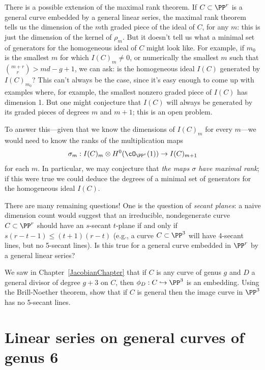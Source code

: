 There is a possible extension of the maximal rank theorem. If $C \subset \PP^r$ is a general curve embedded by a general linear series, the maximal rank theorem tells us the dimension of the $m$th graded piece of the ideal of $C$, for any $m$: this is just the dimension of the kernel of $\rho_m$. But it doesn't tell us what a minimal set of generators for the homogeneous ideal of $C$ might look like. For example, if $m_0$ is the smallest $m$ for which $I(C)_m \neq 0$, or numerically the smallest $m$ such that $\binom{m+r}{r} > md-g+1$, we can ask: is the homogeneous ideal $I(C)$ generated by $I(C)_{m_0}$? This can't always be the case, since it's easy enough to come up with examples where, for example, the  smallest nonzero graded piece of $I(C)$ has dimension 1. But one might conjecture that $I(C)$ will always be generated by its graded pieces of degrees $m$ and $m+1$; this is an open problem.

To answer this---given that we know the dimensions of $I(C)_m$ for every $m$---we would need to know the ranks of the multiplication maps
$$
\sigma_m : I(C)_m \otimes H^0(\cO_{\PP^r}(1)) \to I(C)_{m+1}
$$
for each $m$. In particular, we may conjecture that \emph{the maps $\sigma$ have maximal rank}; if this were true we could deduce the degrees of a minimal set of generators for the homogeneous ideal $I(C)$.


There are many remaining questions! One is the question of \emph{secant planes}: a naive dimension count would suggest that an irreducible, nondegenerate curve $C \subset \PP^r$ should have an $s$-secant $t$-plane if and only if $s(r-t-1) \leq (t+1)(r-t)$
(e.g., a curve $C \subset \PP^3$ will have 4-secant lines, but no 5-secant lines). Is this true for a general curve embedded in $\PP^r$ by a general linear series?

\begin{exercise}
We saw in Chapter~\ref{JacobianChapter} that if $C$ is any curve of genus $g$ and $D$ a general divisor of degree $g+3$ on $C$, then $\phi_D : C \hookrightarrow \PP^3$ is an embedding. Using the Brill-Noether theorem, show that if $C$ is general then the image curve in $\PP^3$ has no 5-secant lines.
\end{exercise}

\section{Linear series on general curves of genus 6}\label{genus 6 section}\label{general genus 6}


